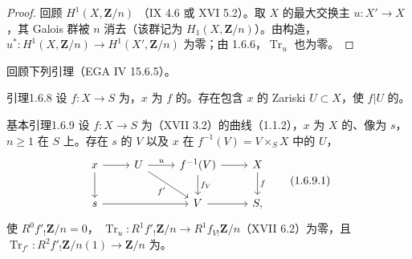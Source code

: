 \begin{proof}
回顾 $H^1(X,\mathbf Z/n)$ （IX 4.6 或 XVI 5.2）。取 $X$ 的最大交换主 $u:X'\to X$，其 Galois 群被 $n$ 消去（该群记为 $H_1(X,\mathbf Z/n)$）。由构造，$u^*:H^1(X,\mathbf Z/n)\to H^1(X',\mathbf Z/n)$ 为零；由 1.6.6，$\operatorname{Tr}_u$ 也为零。
\end{proof}
回顾下列引理（EGA IV 15.6.5）。
\begin{SGAresult}{引理}{1.6.8}
设 $f:X\to S$ 为，$x$ 为 $f$ 的。存在包含 $x$ 的 Zariski  $U\subset X$，使 $f|U$ 的。
\end{SGAresult}
\begin{SGAresult}{基本引理}{1.6.9}
设 $f:X\to S$ 为（XVII 3.2）的曲线（1.1.2），$x$ 为 $X$ 的、像为 $s$，$n\ge1$ 在 $S$ 上。存在 $s$ 的 $V$ 以及 $x$ 在 $f^{-1}(V)=V\times_SX$ 中的 $U$，
\[\begin{tikzcd}x\arrow[r]\arrow[d]&U\arrow[r,"u"]\arrow[dr,"f'"']&f^{-1}(V)\arrow[r]\arrow[d,"f_V"]&X\arrow[d,"f"]\\s\arrow[rr]&&V\arrow[r]&S,\end{tikzcd}\tag{1.6.9.1}\]
使 $R^0f'_!\mathbf Z/n=0$， $\operatorname{Tr}_u:R^1f'_!\mathbf Z/n\to R^1f_{V!}\mathbf Z/n$（XVII 6.2）为零，且 $\operatorname{Tr}_{f'}:R^2f'_!\mathbf Z/n(1)\to\mathbf Z/n$ 为。
\end{SGAresult}

